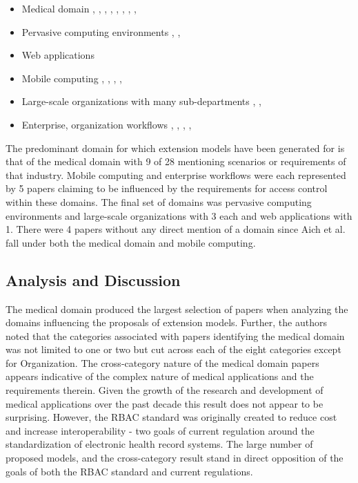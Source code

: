 \begin{itemize}
\setlength{\itemsep}{0.25pt}
\item Medical domain \cite{alam06:constraint}, \cite{tzelepi01:flexible}, \cite{motta03:contextual}, \cite{ni2010privacy}, \cite{damiani2007geo}, \cite{hansen2003spatial}, \cite{samuel07:spatio-temporal}, \cite{aich09:role}, \cite{zhou2007team}
\item Pervasive computing environments \cite{huang06:pervasive}, \cite{chen08:spatio-temporal}, \cite{ray07:spatio}
\item Web applications \cite{masoumzadeh2008purbac}
\item Mobile computing \cite{thein2011leveraging}, \cite{zou2009crbac}, \cite{chandran05:llt}, \cite{ray07:spatio}, \cite{aich09:role}
\item Large-scale organizations with many sub-departments \cite{yamazaki04:designing}, \cite{han08:extended}, \cite{yao2008task}
\item Enterprise, organization workflows \cite{cholewka00:acontext-sensitive}, \cite{bao08:role}, \cite{zhang06:collaborative}, \cite{oh2003task}, \cite{joshi05:generalized}
\end{itemize}

The predominant domain for which extension models have been generated for is that of the medical domain with 9 of 28 mentioning scenarios or requirements of that industry.
Mobile computing and enterprise workflows were each represented by 5 papers claiming to be influenced by the requirements for access control within these domains. The final set
of domains was pervasive computing environments and large-scale organizations with 3 each and web applications with 1.  There were 4 papers without any direct mention of a domain
since Aich et al. \cite{aich09:role} fall under both the medical domain and mobile computing.

\subsection{Analysis and Discussion}

The medical domain produced the largest selection of papers when analyzing the domains influencing the proposals of extension models.  
Further, the authors noted that the categories associated with papers identifying the medical domain was not limited to one or two but cut across
each of the eight categories except for Organization. 
The cross-category nature of the medical domain papers appears indicative of the complex nature of medical applications and the requirements therein.
Given the growth of the research and development of medical applications over the past decade this result does not appear to be surprising. However,
the RBAC standard was originally created to reduce cost and increase interoperability - two goals of current regulation around the standardization
of electronic health record systems. The large number of proposed models, and the cross-category result stand in direct opposition of the goals
of both the RBAC standard and current regulations.

